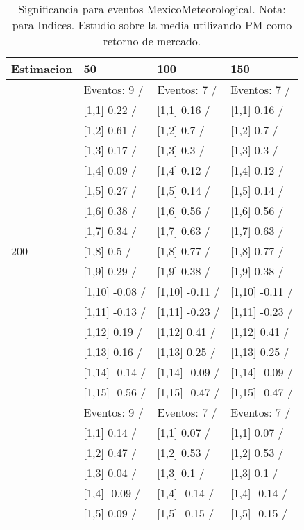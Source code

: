 \begin{table}

\caption{Significancia para eventos MexicoMeteorological. Nota: para Indices. Estudio sobre la media utilizando PM como retorno de mercado.}
\centering
\begin{tabular}[t]{llll}
\toprule
Estimacion & 50 & 100 & 150\\
\midrule
 & Eventos:  9 / & Eventos:  7 / & Eventos:  7 /\\
 & {}[1,1] 0.22  / & {}[1,1] 0.16  / & {}[1,1] 0.16  /\\
 & {}[1,2] 0.61  / & {}[1,2] 0.7  / & {}[1,2] 0.7  /\\
 & {}[1,3] 0.17  / & {}[1,3] 0.3  / & {}[1,3] 0.3  /\\
 & {}[1,4] 0.09  / & {}[1,4] 0.12  / & {}[1,4] 0.12  /\\
\addlinespace
 & {}[1,5] 0.27  / & {}[1,5] 0.14  / & {}[1,5] 0.14  /\\
 & {}[1,6] 0.38  / & {}[1,6] 0.56  / & {}[1,6] 0.56  /\\
 & {}[1,7] 0.34  / & {}[1,7] 0.63  / & {}[1,7] 0.63  /\\
200 & {}[1,8] 0.5  / & {}[1,8] 0.77  / & {}[1,8] 0.77  /\\
 & {}[1,9] 0.29  / & {}[1,9] 0.38  / & {}[1,9] 0.38  /\\
\addlinespace
 & {}[1,10] -0.08  / & {}[1,10] -0.11  / & {}[1,10] -0.11  /\\
 & {}[1,11] -0.13  / & {}[1,11] -0.23  / & {}[1,11] -0.23  /\\
 & {}[1,12] 0.19  / & {}[1,12] 0.41  / & {}[1,12] 0.41  /\\
 & {}[1,13] 0.16  / & {}[1,13] 0.25  / & {}[1,13] 0.25  /\\
 & {}[1,14] -0.14  / & {}[1,14] -0.09  / & {}[1,14] -0.09  /\\
\addlinespace
 & {}[1,15] -0.56  / & {}[1,15] -0.47  / & {}[1,15] -0.47  /\\
 & Eventos:  9 / & Eventos:  7 / & Eventos:  7 /\\
 & {}[1,1] 0.14  / & {}[1,1] 0.07  / & {}[1,1] 0.07  /\\
 & {}[1,2] 0.47  / & {}[1,2] 0.53  / & {}[1,2] 0.53  /\\
 & {}[1,3] 0.04  / & {}[1,3] 0.1  / & {}[1,3] 0.1  /\\
\addlinespace
 & {}[1,4] -0.09  / & {}[1,4] -0.14  / & {}[1,4] -0.14  /\\
 & {}[1,5] 0.09  / & {}[1,5] -0.15  / & {}[1,5] -0.15  /\\

\end{tabular}
\end{table}
